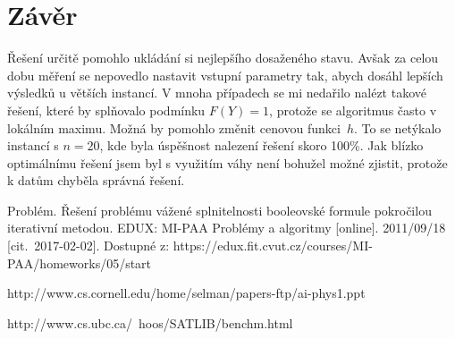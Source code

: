\documentclass[a4paper,10pt]{article}
\begin{document}
\section*{Závěr}

Řešení určitě pomohlo ukládání si nejlepšího dosaženého stavu. Avšak za celou dobu měření se nepovedlo
nastavit vstupní parametry tak, abych dosáhl lepších výsledků u větších instancí.
V mnoha případech se mi nedařilo nalézt takové řešení, které by splňovalo podmínku $F(Y)=1$, protože se
algoritmus často  v lokálním maximu. Možná by pomohlo změnit cenovou funkci~$h$.
To se netýkalo instancí s $n=20$, kde byla úspěšnost nalezení řešení skoro 100\%.
Jak blízko optimálnímu řešení jsem byl s využitím váhy není bohužel možné zjistit, protože k datům chyběla správná řešení.

\renewcommand{\refname}{Použité zdroje}
\begin{thebibliography}{9}


  Problém. Řešení problému vážené splnitelnosti booleovské formule pokročilou iterativní metodou.
  EDUX: MI-PAA Problémy a algoritmy [online]. 2011/09/18
  \mbox{[cit. 2017-02-02]}.
  Dostupné z: https://edux.fit.cvut.cz/courses/MI-PAA/homeworks/05/start
  
  http://www.cs.cornell.edu/home/selman/papers-ftp/ai-phys1.ppt

  http://www.cs.ubc.ca/~hoos/SATLIB/benchm.html
  
\end{thebibliography}
\end{document}
